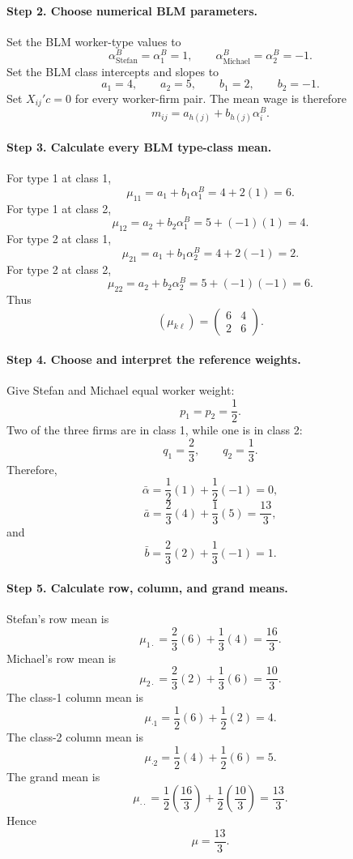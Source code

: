 \documentclass[11pt]{article}
\begin{document}
\paragraph{Step 2. Choose numerical BLM parameters.}

Set the BLM worker-type values to
\[
\alpha_{\text{Stefan}}^B=\alpha_1^B=1,
\qquad
\alpha_{\text{Michael}}^B=\alpha_2^B=-1.
\tag{50}
\]
Set the BLM class intercepts and slopes to
\[
a_1=4,
\qquad
a_2=5,
\qquad
b_1=2,
\qquad
b_2=-1.
\tag{51}
\]
Set \(X_{ij}'c=0\) for every worker-firm pair.  The mean wage is therefore
\[
m_{ij}=a_{h(j)}+b_{h(j)}\alpha_i^B.
\tag{52}
\]

\paragraph{Step 3. Calculate every BLM type-class mean.}

For type 1 at class 1,
\[
\mu_{11}=a_1+b_1\alpha_1^B=4+2(1)=6.
\]
For type 1 at class 2,
\[
\mu_{12}=a_2+b_2\alpha_1^B=5+(-1)(1)=4.
\]
For type 2 at class 1,
\[
\mu_{21}=a_1+b_1\alpha_2^B=4+2(-1)=2.
\]
For type 2 at class 2,
\[
\mu_{22}=a_2+b_2\alpha_2^B=5+(-1)(-1)=6.
\]
Thus
\[
(\mu_{k\ell})
=
\begin{pmatrix}
6&4\\
2&6
\end{pmatrix}.
\tag{53}
\]

\paragraph{Step 4. Choose and interpret the reference weights.}

Give Stefan and Michael equal worker weight:
\[
p_1=p_2=\frac12.
\tag{54}
\]
Two of the three firms are in class 1, while one is in class 2:
\[
q_1=\frac23,
\qquad
q_2=\frac13.
\tag{55}
\]
Therefore,
\[
\bar\alpha
=
\frac12(1)+\frac12(-1)
=0,
\tag{56}
\]
\[
\bar a
=
\frac23(4)+\frac13(5)
=
\frac{13}{3},
\tag{57}
\]
and
\[
\bar b
=
\frac23(2)+\frac13(-1)
=1.
\tag{58}
\]

\paragraph{Step 5. Calculate row, column, and grand means.}

Stefan's row mean is
\[
\mu_{1\cdot}
=
\frac23(6)+\frac13(4)
=
\frac{16}{3}.
\tag{59}
\]
Michael's row mean is
\[
\mu_{2\cdot}
=
\frac23(2)+\frac13(6)
=
\frac{10}{3}.
\tag{60}
\]
The class-1 column mean is
\[
\mu_{\cdot1}
=
\frac12(6)+\frac12(2)
=4.
\tag{61}
\]
The class-2 column mean is
\[
\mu_{\cdot2}
=
\frac12(4)+\frac12(6)
=5.
\tag{62}
\]
The grand mean is
\[
\mu_{\cdot\cdot}
=
\frac12\left(\frac{16}{3}\right)
+
\frac12\left(\frac{10}{3}\right)
=
\frac{13}{3}.
\tag{63}
\]
Hence
\[
\mu=\frac{13}{3}.
\tag{64}
\]
\end{document}

